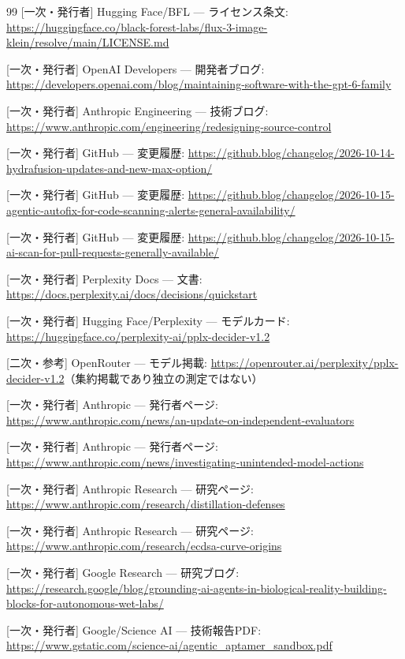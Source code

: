 \documentclass[lualatex,a4paper,10pt]{jlreq}
\begin{document}
\begin{thebibliography}{99}
 [一次・発行者] Hugging Face/BFL — ライセンス条文: \url{https://huggingface.co/black-forest-labs/flux-3-image-klein/resolve/main/LICENSE.md}

 [一次・発行者] OpenAI Developers — 開発者ブログ: \url{https://developers.openai.com/blog/maintaining-software-with-the-gpt-6-family}

 [一次・発行者] Anthropic Engineering — 技術ブログ: \url{https://www.anthropic.com/engineering/redesigning-source-control}

 [一次・発行者] GitHub — 変更履歴: \url{https://github.blog/changelog/2026-10-14-hydrafusion-updates-and-new-max-option/}

 [一次・発行者] GitHub — 変更履歴: \url{https://github.blog/changelog/2026-10-15-agentic-autofix-for-code-scanning-alerts-general-availability/}

 [一次・発行者] GitHub — 変更履歴: \url{https://github.blog/changelog/2026-10-15-ai-scan-for-pull-requests-generally-available/}

 [一次・発行者] Perplexity Docs — 文書: \url{https://docs.perplexity.ai/docs/decisions/quickstart}

 [一次・発行者] Hugging Face/Perplexity — モデルカード: \url{https://huggingface.co/perplexity-ai/pplx-decider-v1.2}

 [二次・参考] OpenRouter — モデル掲載: \url{https://openrouter.ai/perplexity/pplx-decider-v1.2}（集約掲載であり独立の測定ではない）

 [一次・発行者] Anthropic — 発行者ページ: \url{https://www.anthropic.com/news/an-update-on-independent-evaluators}

 [一次・発行者] Anthropic — 発行者ページ: \url{https://www.anthropic.com/news/investigating-unintended-model-actions}

 [一次・発行者] Anthropic Research — 研究ページ: \url{https://www.anthropic.com/research/distillation-defenses}

 [一次・発行者] Anthropic Research — 研究ページ: \url{https://www.anthropic.com/research/ecdsa-curve-origins}

 [一次・発行者] Google Research — 研究ブログ: \url{https://research.google/blog/grounding-ai-agents-in-biological-reality-building-blocks-for-autonomous-wet-labs/}

 [一次・発行者] Google/Science AI — 技術報告PDF: \url{https://www.gstatic.com/science-ai/agentic_aptamer_sandbox.pdf}


\end{thebibliography}
\end{document}

